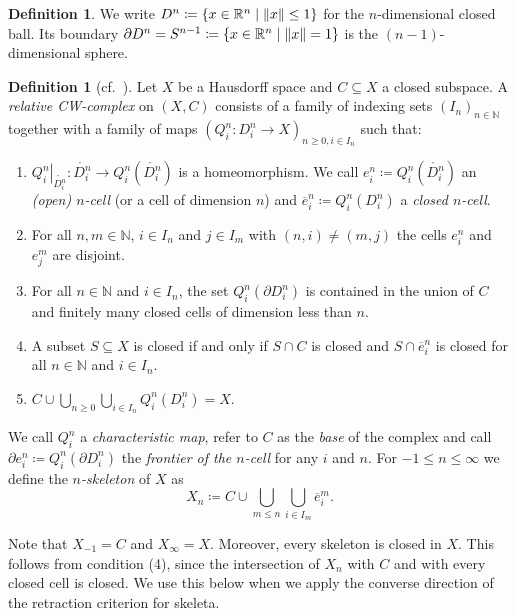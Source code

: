 \documentclass[11pt, a4paper, english]{article}
\DeclarePairedDelimiter\norm{\lVert}{\rVert}
\newcommand{\interior}[1]{\mathring{#1}}
\renewcommand{\boundary}{\partial}
\newcommand{\restrict}[2]{\left.#1\right|_{#2}}
\newcommand{\openCell}[2]{e^{#1}_{#2}}
\newcommand{\closedCell}[2]{\overline{e}^{#1}_{#2}}
\newcommand{\cellFrontier}[2]{\partial e^{#1}_{#2}}
\theoremstyle{plain}
\theoremstyle{definition}
\newtheorem{definition}[theorem]{Definition}
\theoremstyle{remark}
\numberwithin{equation}{section}
\numberwithin{theorem}{section}
\begin{document}
\begin{definition}
We write $D^n \coloneqq \{ x \in \mathbb{R}^n \mid \norm{x} \le 1 \}$ for the $n$-dimensional closed ball.
Its boundary $\partial D^n = S^{n-1} \coloneqq \{ x \in \mathbb{R}^n \mid \norm{x} = 1\} $ is the $(n-1)$-dimensional sphere.
\end{definition}

\begin{definition} [cf.\ {\cite[Definition 1.1.2.]{SCH01}}] \label{def:CWComplex}
Let $X$ be a Hausdorff space and $C \subseteq X$ a closed subspace. A \emph{relative CW-complex} on $(X,C)$ consists of a family of indexing sets $(I_n)_{n \in \mathbb{N}}$ together with a family of maps $(Q_i^n\colon D_i^n\to X)_{n \ge 0, i \in I_n}$ such that:
    \begin{enumerate}
        \item $\restrict{Q_i^n}{\interior{D_i^n}}\colon \interior{D_i^n} \to Q_i^n(\interior{D_i^n})$ is a homeomorphism. We call $\openCell{n}{i} \coloneqq Q_i^n(\interior{D_i^n})$ an \emph{(open) $n$-cell} (or a cell of dimension $n$) and $\closedCell{n}{i} \coloneqq Q_i^n(D_i^n)$ a \emph{closed $n$-cell}.
        \item For all $n, m \in \mathbb{N}$, $i \in I_n$ and $j \in I_m$ with $(n, i) \ne (m, j)$ the cells $\openCell{n}{i}$ and $\openCell{m}{j}$ are disjoint.
        \item For all $n \in \mathbb{N}$ and $i \in I_n$, the set $Q_i^n(\boundary D_i^n)$ is contained in the union of $C$ and finitely many closed cells of dimension less than $n$.
        \item A subset $S \subseteq X$ is closed if and only if $S \cap C$ is closed and $S \cap \closedCell{n}{i}$ is closed for all $n \in \mathbb{N}$ and $i \in I_n$.
        \item $C \cup \bigcup_{n \ge 0}\bigcup_{i \in I_n} Q_i^n(D_i^n) = X$.
    \end{enumerate}
    We call $Q_i^n$ a \emph{characteristic map}, refer to $C$ as the \emph{base} of the complex and call $\cellFrontier{n}{i} \coloneqq Q_i^n(\boundary D_i^n)$ the \emph{frontier of the $n$-cell} for any $i$ and $n$. For $-1 \le n \le \infty$ we define the \emph{$n$-skeleton} of $X$ as
    \[
        X_n \coloneqq C \cup \bigcup_{m \le n} \bigcup_{i \in I_m}
        \closedCell{m}{i} .
    \]
\end{definition}

Note that $X_{-1} = C$ and $X_\infty = X$. Moreover, every skeleton is closed in $X$. This follows from condition (4), since the intersection of $X_n$ with $C$ and with every closed cell is closed. We use this below when we apply the converse direction of the retraction criterion  for skeleta.
\end{document}
